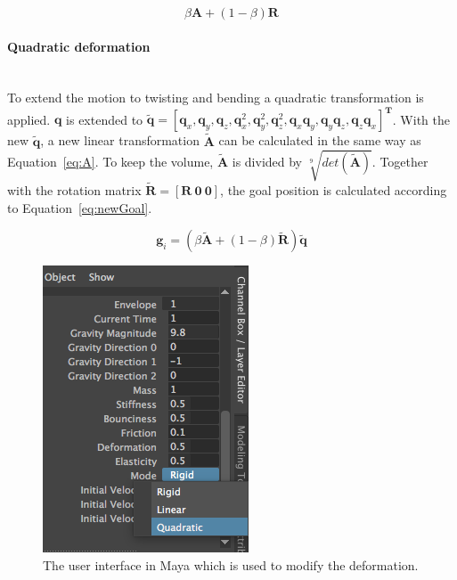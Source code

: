     \begin{equation} \label{eq:T}
        \beta\mathbf{A} + (1 - \beta)\mathbf{R}
    \end{equation}

    \paragraph{Quadratic deformation}\mbox{}\\[5px]
    To extend the motion to twisting and bending a quadratic transformation is applied.
    $\mathbf{q}$ is extended to $\mathbf{\tilde{q}} = [\mathbf{q}_x, \mathbf{q}_y, \mathbf{q}_z, \mathbf{q}_x^2, \mathbf{q}_y^2, \mathbf{q}_z^2, \mathbf{q}_x\mathbf{q}_y, \mathbf{q}_y\mathbf{q}_z, \mathbf{q}_z\mathbf{q}_x]^\mathbf{T}$.
    With the new $\mathbf{\tilde{q}}$, a new linear transformation $\mathbf{\tilde{A}}$ can be calculated in the same way as Equation~\ref{eq:A}.
    To keep the volume, $\mathbf{\tilde{A}}$ is divided by $\sqrt[9]{det(\mathbf{\tilde{A}})}$.
    Together with the rotation matrix $\mathbf{\tilde{R}} = [\mathbf{R~0~0}]$, the goal position is calculated according to Equation~\ref{eq:newGoal}.

    \begin{equation} \label{eq:newGoal}
        \mathbf{g}_i = (\beta\mathbf{\tilde{A}} + (1 - \beta)\mathbf{\tilde{R}})\mathbf{\tilde{q}}
    \end{equation}
    

\begin{figure}[t]
    \centering
    \includegraphics[width=0.8\linewidth]{img/gui.png}
    \caption{The user interface in Maya which is used to modify the deformation.}
    \label{fig:gui}
\end{figure}
 
